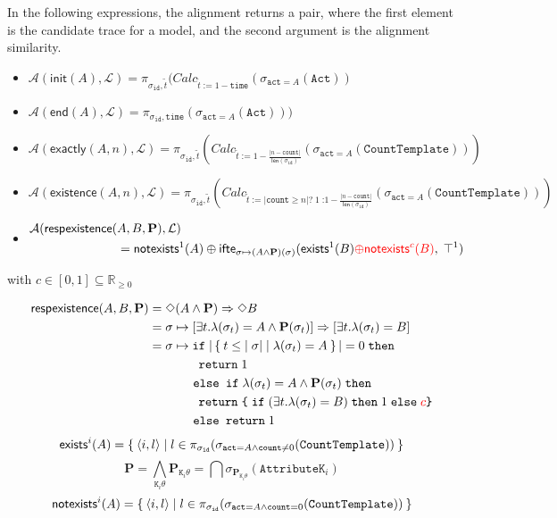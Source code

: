 In the following expressions, the alignment returns a pair, where the first element is the candidate trace for a model, and the second argument is the alignment similarity.
\begin{itemize}

\item $\mathcal{A}(\mathsf{init}(A),\mathcal{L})=\pi_{\sigma_{\texttt{id}},\tilde{{t}}}(\textit{Calc}_{{\tilde{{t}}}:=1-\texttt{time}}(\sigma_{\texttt{act}=A}(\texttt{Act}))$
\item $\mathcal{A}(\mathsf{end}(A),\mathcal{L})=\pi_{\sigma_{\texttt{id}},\texttt{time}}(\sigma_{\texttt{act}=A}(\texttt{Act})))$
\item $\mathcal{A}(\mathsf{exactly}(A,n),\mathcal{L})=\pi_{\sigma_{\texttt{id}},\tilde{t}}(\textit{Calc}_{\tilde{t}:=1-\frac{|n-\texttt{count}|}{\mathsf{len}(\sigma_\texttt{id})}}(\sigma_{\texttt{act}=A}(\texttt{CountTemplate})))$
\item $\mathcal{A}(\mathsf{existence}(A,n),\mathcal{L})=\pi_{\sigma_{\texttt{id}},\tilde{t}}(\textit{Calc}_{\tilde{t}:=|\texttt{count}\geq n|\texttt{?}\;1\;\texttt{:}1-\frac{|n-\texttt{count}|}{\mathsf{len}(\sigma_\texttt{id})}}(\sigma_{\texttt{act}=A}(\texttt{CountTemplate})))$
\item \begin{align*}
\mathcal{A}(\mathsf{respexistence}(&A,B,\mathbf{P}),\mathcal{L})\\
&=\mathsf{notexists}^1(A)\oplus\mathsf{ifte}_{\sigma\mapsto(A\wedge \mathbf{P})(\sigma)}(\mathsf{exists}^1(B){\color{red}\oplus\mathsf{notexists}^{c}(B)},\;\top^1)
\end{align*}
\end{itemize} {\color{red}with $c\in[0,1]\subseteq\mathbb{R}_{\geq 0}$}


\begin{align*}
\mathsf{respexistence}(A,B,\mathbf{P})&=\Diamond(A\wedge \mathbf{P})\Rightarrow\Diamond B\\
	&=\sigma\mapsto [\exists t. \lambda(\sigma_t)=A\wedge \mathbf{P}(\sigma_t)]\Rightarrow [\exists t. \lambda(\sigma_t)=B]\\
	&=\sigma\mapsto\texttt{if}\;{|\Set{t\leq |\sigma|\;|\;\lambda(\sigma_t)=A}|=0}\;\texttt{then}\\
	&\qquad\qquad \texttt{return}\;1\\
	&\qquad\quad\;\; \texttt{else if}\; \lambda(\sigma_t)=A\wedge\mathbf{P}(\sigma_t)\;\texttt{then}\\
	&\qquad\qquad \texttt{return\;\{\;if}\;(\exists t.\lambda(\sigma_t)=B)\;   \texttt{then}\;1\;\texttt{else}\;{\color{red}c}\texttt{\}}\\
	&\qquad\quad\;\; \texttt{else return}\;1\\
\end{align*}
\[\mathsf{exists}^i(A)=\Set{\braket{i,l}|l\in\pi_{\sigma_{\texttt{id}}}(\sigma_{\texttt{act}=A\wedge \texttt{count}\neq0}(\texttt{CountTemplate}))}\]
\[\mathbf{P}=\bigwedge_{\texttt{K}_i\theta} \mathbf{P}_{\texttt{K}_i\theta}=\bigcap \sigma_{\mathbf{P}_{\texttt{K}_i\theta}}(\texttt{AttributeK}_i)\]
\[\mathsf{notexists}^i(A)=\Set{\braket{i,l}|l\in\pi_{\sigma_{\texttt{id}}}(\sigma_{\texttt{act}=A\wedge \texttt{count}=0}(\texttt{CountTemplate}))}\]

